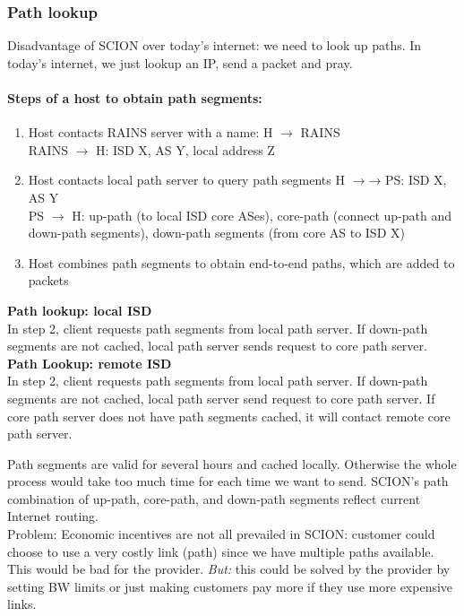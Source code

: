 \subsubsection{Path lookup}
Disadvantage of SCION over today's internet: we need to look up paths. In today's internet, we just lookup an IP, send a packet and pray.\\

\paragraph{Steps of a host to obtain path segments:}
\begin{enumerate}
	\item Host contacts RAINS server with a name: H $\rightarrow$ RAINS\\
	RAINS $\rightarrow$ H: ISD X, AS Y, local address Z
	\item Host contacts local path server to query path segments H $\rightarrow$→ PS: ISD X, AS Y\\
	PS $\rightarrow$ H: up-path (to local ISD core ASes), core-path (connect up-path and down-path
	segments), down-path segments (from core AS to ISD X)
	\item Host combines path segments to obtain end-to-end 	paths, which are added to packets\\
\end{enumerate}

\textbf{Path lookup: local ISD}\\
In step 2, client requests path segments from local path server. If down-path segments are not cached, local path server sends request to core path server.\\

\textbf{Path Lookup: remote ISD}\\
In step 2, client requests path segments from local path server. If down-path segments are not cached, local path server send request to core path server. If core path server does not have path segments cached, it will contact remote core path server.

Path segments are valid for several hours and cached locally. Otherwise the whole process would take too much time for each time we want to send. SCION’s path combination of up-path, core-path, and down-path segments reflect current Internet routing.\\

Problem: Economic incentives are not all prevailed in SCION: customer could choose to use a very costly link (path) since we have multiple paths available. This would be bad for the provider. \textit{But:} this could be solved by the provider by setting BW limits or just making customers pay more if they use more expensive links.


